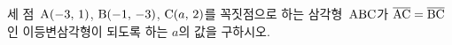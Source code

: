 세 점~$\mathrm{A}(-3,\mkern3mu 1)$, $\mathrm{B}(-1,\mkern3mu -3)$, $\mathrm{C}(a,\mkern3mu 2)$를 꼭짓점으로 하는 삼각형~$\mathrm{ABC}$가 $\overline{\mathrm{AC}}=\overline{\mathrm{BC}}$인 이등변삼각형이 되도록 하는 $a$의 값을 구하시오.
